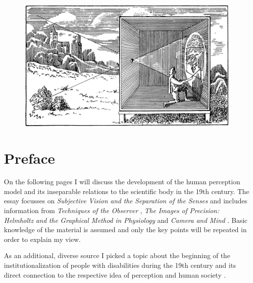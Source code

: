 \documentclass[12pt,a4paper]{article}
\begin{document}
\begin{titlepage}

\vspace{1cm}

\begin{figure}[h]
	\centering
	\includegraphics[width=\textwidth]{img/cameraobscura.jpeg}
\end{figure}

\vspace{8cm}
\center{\today}

\end{titlepage}


\newpage

\section*{Preface}

On the following pages I will discuss the development of the human perception model and its
inseparable relations to the scientific body in the 19th century. The essay focusses on
{\it{Subjective Vision and the Separation of the Senses}} \cite{crary} and includes information from
{\it{Techniques of the Observer}} \cite{crary}, {\it{The Images of Precision: Helmholtz and the
Graphical Method in Physiology}} \cite{holmes} and {\it{Camera and Mind}} \cite{ellenbogen}. Basic
knowledge of the material is assumed and only the key points will be repeated in order to explain
my view.

As an additional, diverse source I picked a topic about the beginning of the institutionalization of people
with disabilities during the 19th century and its direct connection to the respective idea of
perception and human society \cite{earlymovement}.
\end{document}
